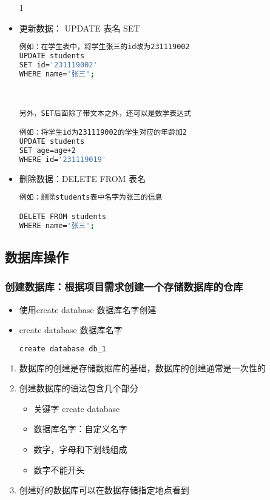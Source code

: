 \begin{itemize}
1

\item 更新数据： UPDATE 表名 SET
\begin{lstlisting}[language=bash]
例如：在学生表中，将学生张三的id改为231119002
UPDATE students 
SET id='231119002'
WHERE name='张三';



另外，SET后面除了带文本之外，还可以是数学表达式

例如：将学生id为231119002的学生对应的年龄加2
UPDATE students 
SET age=age+2
WHERE id='231119019'
\end{lstlisting}

\item 删除数据：DELETE FROM 表名
\begin{lstlisting}[language=bash]
例如：删除students表中名字为张三的信息

DELETE FROM students 
WHERE name='张三';
\end{lstlisting}


\end{itemize}

\subsection{数据库操作}
\subsubsection{创建数据库：根据项目需求创建一个存储数据库的仓库}
\begin{itemize}

\item 使用create database 数据库名字创建
\item create database 数据库名字
\begin{lstlisting}[language=bash]
create database db_1
\end{lstlisting}

\end{itemize}
\begin{enumerate}
\item 数据库的创建是存储数据库的基础，数据库的创建通常是一次性的
\item 创建数据库的语法包含几个部分
\begin{itemize}
\item 关键字 create database
\item 数据库名字：自定义名字
\item  数字，字母和下划线组成
\item 数字不能开头
\end{itemize}
\item  创建好的数据库可以在数据存储指定地点看到



\end{enumerate}

